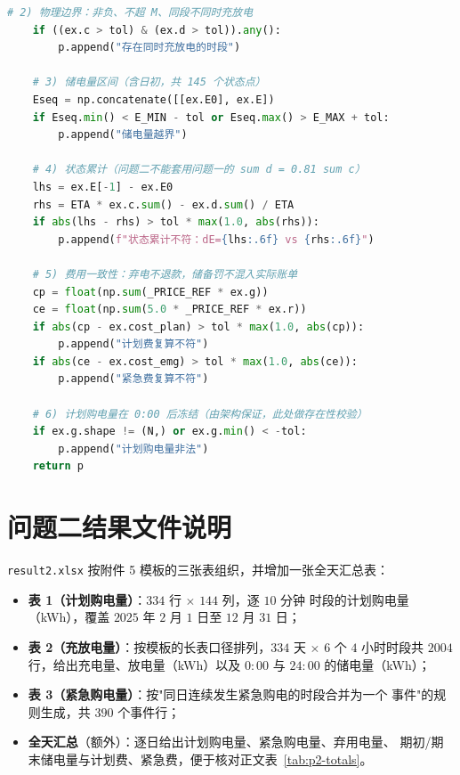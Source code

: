 \documentclass[withoutpreface,bwprint]{cumcmthesis}
\begin{document}
\begin{appendices}
\begin{lstlisting}[language=Python]
    # 2) 物理边界：非负、不超 M、同段不同时充放电
    if ((ex.c > tol) & (ex.d > tol)).any():
        p.append("存在同时充放电的时段")

    # 3) 储电量区间（含日初，共 145 个状态点）
    Eseq = np.concatenate([[ex.E0], ex.E])
    if Eseq.min() < E_MIN - tol or Eseq.max() > E_MAX + tol:
        p.append("储电量越界")

    # 4) 状态累计（问题二不能套用问题一的 sum d = 0.81 sum c）
    lhs = ex.E[-1] - ex.E0
    rhs = ETA * ex.c.sum() - ex.d.sum() / ETA
    if abs(lhs - rhs) > tol * max(1.0, abs(rhs)):
        p.append(f"状态累计不符：dE={lhs:.6f} vs {rhs:.6f}")

    # 5) 费用一致性：弃电不退款，储备罚不混入实际账单
    cp = float(np.sum(_PRICE_REF * ex.g))
    ce = float(np.sum(5.0 * _PRICE_REF * ex.r))
    if abs(cp - ex.cost_plan) > tol * max(1.0, abs(cp)):
        p.append("计划费复算不符")
    if abs(ce - ex.cost_emg) > tol * max(1.0, abs(ce)):
        p.append("紧急费复算不符")

    # 6) 计划购电量在 0:00 后冻结（由架构保证，此处做存在性校验）
    if ex.g.shape != (N,) or ex.g.min() < -tol:
        p.append("计划购电量非法")
    return p
\end{lstlisting}

\section{问题二结果文件说明}

\texttt{result2.xlsx} 按附件 5 模板的三张表组织，并增加一张全天汇总表：

\begin{itemize}
  \item \textbf{表 1（计划购电量）}：$334$ 行 $\times$ $144$ 列，逐 $10$ 分钟
        时段的计划购电量（kWh），覆盖 $2025$ 年 $2$ 月 $1$ 日至 $12$ 月 $31$ 日；
  \item \textbf{表 2（充放电量）}：按模板的长表口径排列，$334$ 天 $\times$
        $6$ 个 $4$ 小时时段共 $2004$ 行，给出充电量、放电量（kWh）以及
        $0{:}00$ 与 $24{:}00$ 的储电量（kWh）；
  \item \textbf{表 3（紧急购电量）}：按"同日连续发生紧急购电的时段合并为一个
        事件"的规则生成，共 $390$ 个事件行；
  \item \textbf{全天汇总}（额外）：逐日给出计划购电量、紧急购电量、弃用电量、
        期初/期末储电量与计划费、紧急费，便于核对正文表~\ref{tab:p2-totals}。
\end{itemize}


\end{appendices}
\end{document}
